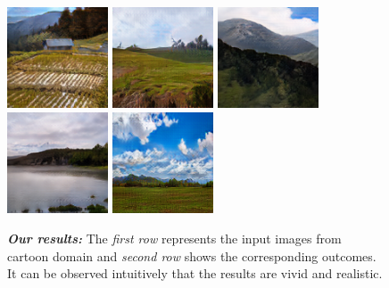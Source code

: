 \documentclass[10pt,twocolumn,letterpaper]{article}
\begin{document}
\begin{figure}[!htb]
\subfigure
{\includegraphics[width=30mm]{best_ones/4999_fake_B.png}}
\subfigure
{\includegraphics[width=30mm]{best_ones/5407_fake_B.png}}
\subfigure
{\includegraphics[width=30mm]{best_ones/5130_fake_B.png}}
\subfigure
{\includegraphics[width=30mm]{best_ones/5468_fake_B.png}}
\subfigure
{\label{fig:res_b}\includegraphics[width=30mm]{best_ones/616_fake_B.png}}

\caption{\textit{\textbf{Our results:}} The \textit{first row} represents the input images from cartoon domain and \textit{second row} shows the corresponding outcomes. It can be observed intuitively that the results are vivid and realistic.}
\label{fig:results}
\end{figure}
\end{document}
